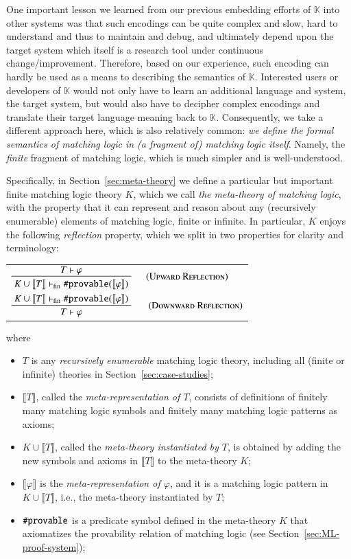 \documentclass[UTF8,11pt]{article}
\theoremstyle{plain}
\theoremstyle{definition}
\theoremstyle{remark}
\newcommand{\vdashfin}{\vdash_\text{fin}}
\newcommand{\K}{\mbox{$\mathbb{K}$}\xspace}
\newcommand{\denote}[1]{\llbracket{#1}\rrbracket}
\newcommand{\sharpsymbol}{\#}
\newcommand{\Kdeduce}{\textup{\texttt{\sharpsymbol provable}}}
\begin{document}
One important lesson we learned from our previous embedding efforts of \K
into other systems was that such encodings can be quite complex and slow,
hard to understand and thus to maintain and debug, and ultimately depend
upon the target system which itself is a research tool under continuous
change/improvement.
Therefore, based on our experience, such encoding can hardly
be used as a means to describing the semantics of \K.
Interested users or developers of \K would not only have to learn an
additional language and system, the target system, but would also have to
decipher complex encodings and translate their target language meaning back
to \K.
Consequently, we take a different approach here, which is also relatively
common:
\emph{we define the formal semantics of matching logic in (a fragment of)
matching logic itself}.
Namely, the \emph{finite} fragment of matching logic, which is much simpler
and is well-understood.

Specifically, in Section~\ref{sec:meta-theory} we define a particular but
important finite matching logic theory $K$, which we call
\emph{the meta-theory of matching logic}, with the property that it can
represent and reason about any (recursively enumerable) elements of
matching logic, finite or infinite.
In particular, $K$ enjoys the following \emph{reflection} property, which we
split in two properties for clarity and terminology:
\begin{center}
 \begin{tabular}{l}
  $
  \prftree[r]{\hspace*{3ex}\textsc{(Upward Reflection)}}
  {T \vdash \varphi}
  {K \cup \denote{T} \vdashfin \Kdeduce(\denote{\varphi})}
  $
  \\[4ex]
  $
  \prftree[r]{\hspace*{3ex} \textsc{(Downward Reflection)}}
  {K \cup \denote{T} \vdashfin \Kdeduce(\denote{\varphi})}
  {T \vdash \varphi}
  $
 \end{tabular}
\end{center}
where
\begin{itemize}
 \item $T$ is any \emph{recursively enumerable} matching logic theory,
 including all (finite or infinite) theories in
 Section~\ref{sec:case-studies};
 \item $\denote{T}$, called the \emph{meta-representation of $T$}, consists
 of definitions of finitely many matching logic symbols and finitely many
 matching logic patterns as axioms;
 \item $K \cup \denote{T}$, called the \emph{meta-theory instantiated by
 $T$}, is obtained by adding the new symbols and axioms in
 $\denote{T}$ to the meta-theory $K$;
 \item $\denote{\varphi}$ is the \emph{meta-representation of $\varphi$},
 and it is a matching logic pattern in $K \cup \denote{T}$, i.e., the
 meta-theory instantiated by $T$;
 \item $\Kdeduce$ is a predicate symbol defined in the meta-theory $K$ that
 axiomatizes the provability relation of matching logic (see
 Section~\ref{sec:ML-proof-system});
\end{itemize}
 
\end{document}
